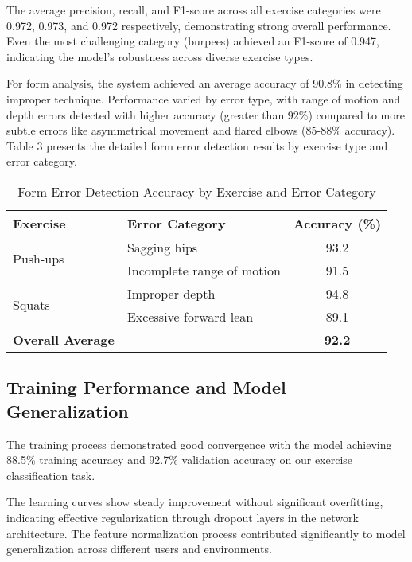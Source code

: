 \documentclass[11pt]{article}
\begin{document}
The average precision, recall, and F1-score across all exercise categories were 0.972, 0.973, and 0.972 respectively, demonstrating strong overall performance. Even the most challenging category (burpees) achieved an F1-score of 0.947, indicating the model's robustness across diverse exercise types.

For form analysis, the system achieved an average accuracy of 90.8\% in detecting improper technique. Performance varied by error type, with range of motion and depth errors detected with higher accuracy (greater than 92\%) compared to more subtle errors like asymmetrical movement and flared elbows (85-88\% accuracy). Table 3 presents the detailed form error detection results by exercise type and error category.

\begin{table}[h]
\caption{Form Error Detection Accuracy by Exercise and Error Category}
\begin{center}
\begin{tabular}{|l|l|c|}
\hline
\textbf{Exercise} & \textbf{Error Category} & \textbf{Accuracy (\%)} \\
\hline
\multirow{2}{*}{Push-ups} & Sagging hips & 93.2 \\
\cline{2-3}
 & Incomplete range of motion & 91.5 \\
\hline
\multirow{2}{*}{Squats} & Improper depth & 94.8 \\
\cline{2-3}
 & Excessive forward lean & 89.1 \\
\hline
\textbf{Overall Average} & & \textbf{92.2} \\
\hline
\end{tabular}
\label{tab:form_accuracy}
\end{center}
\end{table}

\subsection{Training Performance and Model Generalization}
The training process demonstrated good convergence with the model achieving 88.5\% training accuracy and 92.7\% validation accuracy on our exercise classification task.

The learning curves show steady improvement without significant overfitting, indicating effective regularization through dropout layers in the network architecture. The feature normalization process contributed significantly to model generalization across different users and environments.
\end{document}
